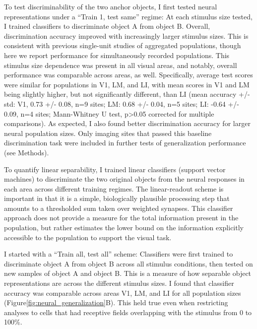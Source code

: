 To test discriminability of the two anchor objects, I first tested neural representations under a ``Train 1, test same'' regime: At each stimulus size tested, I trained classifiers to discriminate object A from object B. Overall, discrimination accuracy improved with increasingly larger stimulus sizes. This is consistent with previous single-unit studies of aggregated populations, though here we report performance for simultaneously recorded populations. This stimulus size dependence was present in all visual areas, and notably, overall performance was comparable across areas, as well. Specifically, average test scores were similar for populations in V1, LM, and LI, with mean scores in V1 and LM being slightly higher, but not significantly different, than LI (mean accuracy +/- std: V1, 0.73 +/- 0.08, n=9 sites; LM: 0.68 +/- 0.04, n=5 sites; LI: -0.64 +/- 0.09, n=4 sites; Mann-Whitney U test, p>0.05 corrected for multiple comparisons). As expected, I also found better discrimination accuracy for larger neural population sizes. Only imaging sites that passed this baseline discrimination task were included in further tests of generalization performance (see Methods). 

To quantify linear separability, I trained linear classifiers (support vector machines) to discriminate the two original objects from the neural responses in each area across different training regimes. The linear-readout scheme is important in that it is a simple, biologically plausible processing step that amounts to a thresholded sum taken over weighted synapses. This classifier approach does not provide a measure for the total information present in the population, but rather estimates the lower bound on the information explicitly accessible to the population to support the visual task. 

I started with a ``Train all, test all'' scheme:  Classifiers were first trained to discriminate object A from object B across all stimulus conditions, then tested on new samples of object A and object B. This is a measure of how separable object representations are across the different stimulus sizes. I found that classifier accuracy was comparable across areas V1, LM, and LI for all population sizes (Figure\ref{fig:neural_generalization}B). This held true even when restricting analyses to cells that had receptive fields overlapping with the stimulus from 0 to 100\%. %


